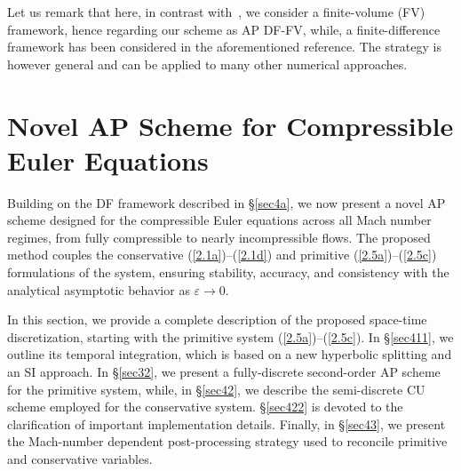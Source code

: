 \documentclass[A4paper,12pt,twoside]{article}
\numberwithin{equation}{section}
\numberwithin{figure}{section}
\numberwithin{table}{section}
\newcommand{\ve}{\varepsilon}
\newcommand\eref[1]{(\ref{#1})}
\newcommand{\lore}[1]{{\leavevmode\color{red} #1}}
\begin{document}
\lore{%
	Let us remark that here, in contrast with~\cite{CFKM}, we consider a finite-volume (FV) framework, hence regarding our scheme as AP DF-FV, while,  a finite-difference framework has been considered in the aforementioned reference. The strategy is however general and can be applied to many other numerical approaches.}

\section{Novel AP Scheme for Compressible Euler Equations}\label{sec4}
Building on the \lore{DF} framework described in \S\ref{sec4a}, we now present a novel AP scheme designed for the compressible Euler equations
across %
\lore{all} Mach number regimes, from fully compressible to nearly incompressible flows. The proposed method couples the
conservative \eref{2.1a}--\eref{2.1d} and primitive \eref{2.5a}--\eref{2.5c} formulations of the system, ensuring stability, accuracy, and
consistency with the %
\lore{analytical} asymptotic behavior as $\ve\to0$.

In this section, we provide a complete description of the proposed space-time discretization, starting with the primitive system
\eref{2.5a}–\eref{2.5c}. In \S\ref{sec411}, we outline its temporal integration, which is based on a new hyperbolic splitting and an SI
approach. 
In \S\ref{sec32}, we present a \lore{fully-discrete} second-order AP scheme for the primitive system, \lore{while}, %
in \S\ref{sec42}, we describe
the semi-discrete CU scheme \lore{employed} for the conservative system. \S\ref{sec422} is devoted to the clarification 
of important implementation details.
Finally, in \S\ref{sec43}, we present \lore{the Mach-number dependent} post-processing strategy used to reconcile primitive and conservative variables.
\end{document}
